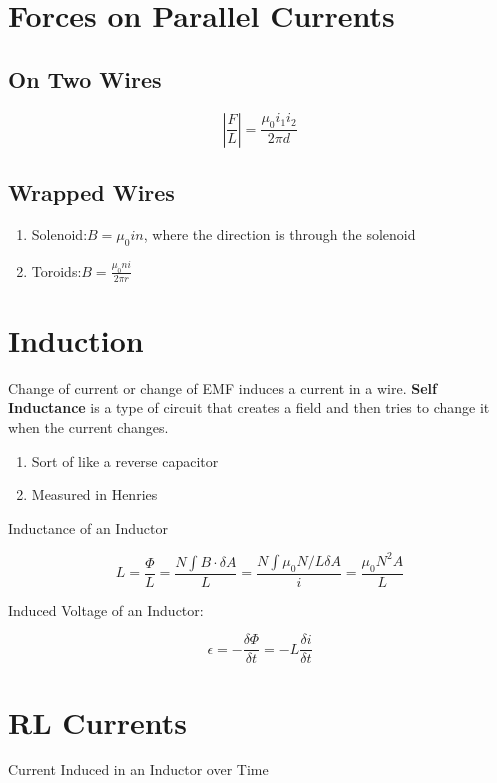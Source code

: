 \documentclass{article}
\begin{document}
\section{Forces on Parallel Currents}

\subsection{On Two Wires}

$$\left|\frac{F}{L} \right| = \frac{\mu_0 i_1 i_2}{2\pi d}$$

\subsection{Wrapped Wires}

\begin{enumerate}
    \item Solenoid:$B = \mu_0 i n$, where the direction is through the solenoid
    \item Toroids:$B = \frac{\mu_0 n i}{2\pi r}$
\end{enumerate}

\section{Induction}

Change of current or change of EMF induces a current in a wire. \textbf{Self Inductance} is a type of circuit that creates a field and then tries to change it when the current changes.

\begin{enumerate}
    \item Sort of like a reverse capacitor
    \item Measured in Henries
\end{enumerate}

Inductance of an Inductor

\[
    L = \frac{\Phi}{L} = \frac{N \int B \cdot \delta A}{L} = \frac{N \int \mu_0 N / L \delta A}{i} = \frac{\mu_0 N^2 A}{L}
\]

Induced Voltage of an Inductor:

\[
    \epsilon = -\frac{\delta \Phi}{\delta t} = - L \frac{\delta i}{\delta t}
\]

\section{RL Currents}

Current Induced in an Inductor over Time
\end{document}
